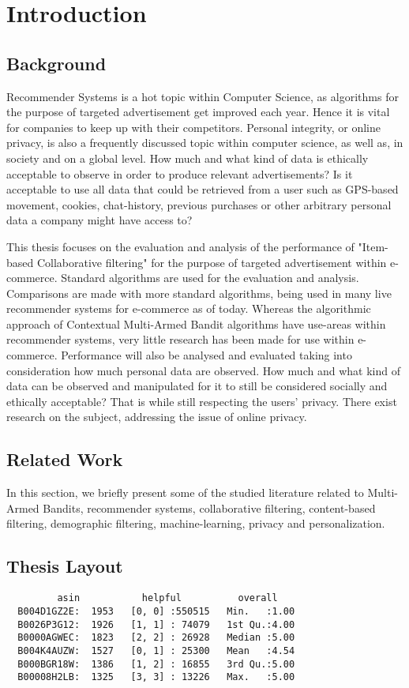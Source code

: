 \chapter{Introduction}

\section{Background}

Recommender Systems is a hot topic within Computer Science, as algorithms for the purpose of targeted advertisement get improved each year. Hence it is vital for companies to keep up with their competitors. Personal integrity, or online privacy, is also a frequently discussed topic within computer science, as well as, in society and on a global level. How much and what kind of data is ethically acceptable to observe in order to produce relevant advertisements? Is it acceptable to use all data that could be retrieved from a user such as GPS-based movement, cookies, chat-history, previous purchases or other arbitrary personal data a company might have access to?

This thesis focuses on the evaluation and analysis of the performance of "Item-based Collaborative filtering" for the purpose of targeted advertisement within e-commerce. Standard algorithms are used for the evaluation and analysis.
Comparisons are made with more standard algorithms, being used in many live recommender systems for e-commerce as of today. Whereas the algorithmic approach of Contextual Multi-Armed Bandit algorithms have use-areas within recommender systems, very little research has been made for use within e-commerce. Performance will also be analysed and evaluated taking into consideration how much personal data are observed. How much and what kind of data can be observed and manipulated for it to still be considered socially and ethically acceptable? That is while still respecting the users’ privacy. There exist research on the subject, addressing the issue of online privacy. \cite{Park2012}

\section{Related Work}
In this section, we briefly present some of the studied literature related to Multi-Armed Bandits, recommender systems, collaborative filtering, content-based filtering, demographic filtering, machine-learning, privacy and personalization.

\section{Thesis Layout}

\begin{verbatim}
         asin           helpful          overall    
  B004D1GZ2E:  1953   [0, 0] :550515   Min.   :1.00  
  B0026P3G12:  1926   [1, 1] : 74079   1st Qu.:4.00  
  B0000AGWEC:  1823   [2, 2] : 26928   Median :5.00  
  B004K4AUZW:  1527   [0, 1] : 25300   Mean   :4.54  
  B000BGR18W:  1386   [1, 2] : 16855   3rd Qu.:5.00  
  B00008H2LB:  1325   [3, 3] : 13226   Max.   :5.00  
\end{verbatim}



